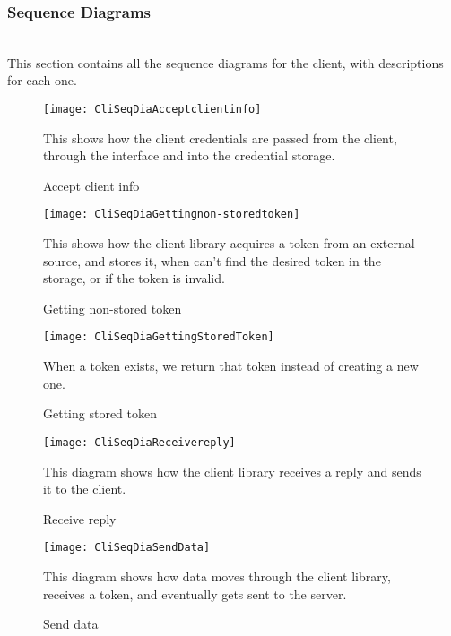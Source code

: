 	\subsubsection{Sequence Diagrams}\label{client sequence diagrams}\\
This section contains all the sequence diagrams for the client, with descriptions for each one.
		\begin{figure}[H]
			\centering	
			\texttt{[image: CliSeqDiaAcceptclientinfo]}
			\caption{Accept client info}
			This shows how the client credentials are passed from the client, through the interface and into the credential storage.
			\label{fig:CliSeqDiaAcceptclientinfo}
		\end{figure}
		\begin{figure}[H]
			\centering	
			\texttt{[image: CliSeqDiaGettingnon-storedtoken]}
			\caption{Getting non-stored token}
			This shows how the client library acquires a token from an external source, and stores it, when can't find the desired token in the storage, or if the token is invalid.
			\label{fig:CliSeqDiaGettingnon-storedtoken}
		\end{figure}
		\begin{figure}[H]
			\centering	
			\texttt{[image: CliSeqDiaGettingStoredToken]}
			\caption{Getting stored token}
			When a token exists, we return that token instead of creating a new one. 
			\label{fig:CliSeqDiaGettingStoredToken}
		\end{figure}
		\begin{figure}[H]
			\centering	
			\texttt{[image: CliSeqDiaReceivereply]}
			\caption{Receive reply}
			This diagram shows how the client library receives a reply and sends it to the client. 
			\label{fig:CliSeqDiaReceivereply}
		\end{figure}
		\begin{figure}[H]
			\centering	
			\texttt{[image: CliSeqDiaSendData]}
			\caption{Send data}
			This diagram shows how data moves through the client library, receives a token, and eventually gets sent to the server. 
			\label{fig:CliSeqDiaSendData}
		\end{figure}

		

